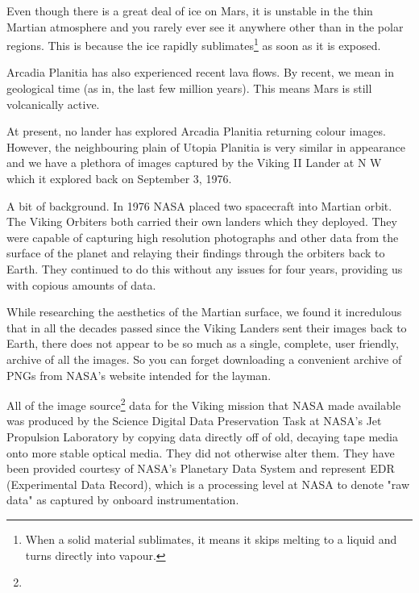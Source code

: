 Even though there is a great deal of ice on Mars, it is unstable in the thin Martian atmosphere and you rarely ever see it anywhere other than in the polar regions. This is because the ice rapidly sublimates\footnote{When a solid material sublimates, it means it skips melting to a liquid and turns directly into vapour.} as soon as it is exposed.

Arcadia Planitia has also experienced recent lava flows. By recent, we mean in geological time (as in, the last few million years). This means Mars is still volcanically active.


At present, no lander has explored Arcadia Planitia returning colour images. However, the neighbouring plain of Utopia Planitia is very similar in appearance and we have a plethora of images captured by the Viking II Lander at N W which it explored back on September 3, 1976.

A bit of background. In 1976 NASA placed two spacecraft into Martian orbit. The Viking Orbiters both carried their own landers which they deployed. They were capable of capturing high resolution photographs and other data from the surface of the planet and relaying their findings through the orbiters back to Earth. They continued to do this without any issues for four years, providing us with copious amounts of data. 


While researching the aesthetics of the Martian surface, we found it incredulous that in all the decades passed since the Viking Landers sent their images back to Earth, there does not appear to be so much as a single, complete, user friendly, archive of all the images. So you can forget downloading a convenient archive of PNGs from NASA's website intended for the layman.

All of the image source\footnote{} data for the Viking mission that NASA made available was produced by the Science Digital Data Preservation Task at NASA's Jet Propulsion Laboratory by copying data directly off of old, decaying tape media onto more stable optical media. They did not otherwise alter them. They have been provided courtesy of NASA's Planetary Data System and represent EDR (Experimental Data Record), which is a processing level at NASA to denote "raw data" as captured by onboard instrumentation.

